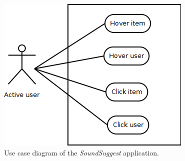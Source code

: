 \begin{figure}
  \begin{center}
  \includegraphics[scale=0.7]{img/usecase_diagram}
	\end{center}
  \caption{Use case diagram of the \emph{SoundSuggest} application.}
  \label{fig:use_case_diagram}
\end{figure}






